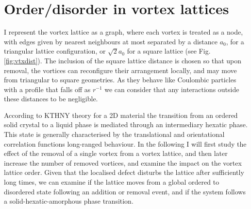 \section{Order/disorder in vortex lattices}\label{sec:disorder}

I represent the vortex lattice as a graph, where each vortex is treated as a node, with edges given by nearest neighbours at most separated by a distance $a_0$, for a triangular lattice configuration, or $\sqrt{2}a_0$ for a square lattice (see Fig. \ref{fig:vtxdist}). The inclusion of the square lattice distance is chosen so that upon removal, the vortices can reconfigure their arrangement locally, and may move from triangular to square geometries. As they behave like Coulombic particles with a profile that falls off as $r^{-1}$ we can consider that any interactions outside these distances to be negligible.

According to KTHNY theory for a 2D material the transition from an ordered solid crystal to a liquid phase is mediated through an intermediary hexatic phase. This state is generally characterised by the translational and orientational correlation functions long-ranged behaviour. In the following I will first study the effect of the removal of a single vortex from a vortex lattice, and then later increase the number of removed vortices, and examine the impact on the vortex lattice order. Given that the localised defect disturbs the lattice after sufficiently long times, we can examine if the lattice moves from a global ordered to disordered state following an addition or removal event, and if the system follows a solid-hexatic-amorphous phase transition.

